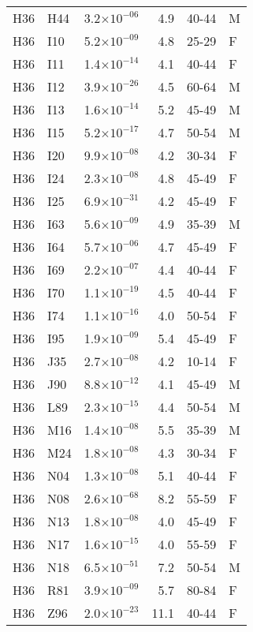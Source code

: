 \begin{longtable}{lllrll}
   H36 & H44 & 3.2$\times10^{-06}$ & 4.9 & 40-44 & M \\ 
   H36 & I10 & 5.2$\times10^{-09}$ & 4.8 & 25-29 & F \\ 
   H36 & I11 & 1.4$\times10^{-14}$ & 4.1 & 40-44 & F \\ 
   H36 & I12 & 3.9$\times10^{-26}$ & 4.5 & 60-64 & M \\ 
   H36 & I13 & 1.6$\times10^{-14}$ & 5.2 & 45-49 & M \\ 
   H36 & I15 & 5.2$\times10^{-17}$ & 4.7 & 50-54 & M \\ 
   H36 & I20 & 9.9$\times10^{-08}$ & 4.2 & 30-34 & F \\ 
   H36 & I24 & 2.3$\times10^{-08}$ & 4.8 & 45-49 & F \\ 
   H36 & I25 & 6.9$\times10^{-31}$ & 4.2 & 45-49 & F \\ 
   H36 & I63 & 5.6$\times10^{-09}$ & 4.9 & 35-39 & M \\ 
   H36 & I64 & 5.7$\times10^{-06}$ & 4.7 & 45-49 & F \\ 
   H36 & I69 & 2.2$\times10^{-07}$ & 4.4 & 40-44 & F \\ 
   H36 & I70 & 1.1$\times10^{-19}$ & 4.5 & 40-44 & F \\ 
   H36 & I74 & 1.1$\times10^{-16}$ & 4.0 & 50-54 & F \\ 
   H36 & I95 & 1.9$\times10^{-09}$ & 5.4 & 45-49 & F \\ 
   H36 & J35 & 2.7$\times10^{-08}$ & 4.2 & 10-14 & F \\ 
   H36 & J90 & 8.8$\times10^{-12}$ & 4.1 & 45-49 & M \\ 
   H36 & L89 & 2.3$\times10^{-15}$ & 4.4 & 50-54 & M \\ 
   H36 & M16 & 1.4$\times10^{-08}$ & 5.5 & 35-39 & M \\ 
   H36 & M24 & 1.8$\times10^{-08}$ & 4.3 & 30-34 & F \\ 
   H36 & N04 & 1.3$\times10^{-08}$ & 5.1 & 40-44 & F \\ 
   H36 & N08 & 2.6$\times10^{-68}$ & 8.2 & 55-59 & F \\ 
   H36 & N13 & 1.8$\times10^{-08}$ & 4.0 & 45-49 & F \\ 
   H36 & N17 & 1.6$\times10^{-15}$ & 4.0 & 55-59 & F \\ 
   H36 & N18 & 6.5$\times10^{-51}$ & 7.2 & 50-54 & M \\ 
   H36 & R81 & 3.9$\times10^{-09}$ & 5.7 & 80-84 & F \\ 
   H36 & Z96 & 2.0$\times10^{-23}$ & 11.1 & 40-44 & F \\ 

\end{longtable}
